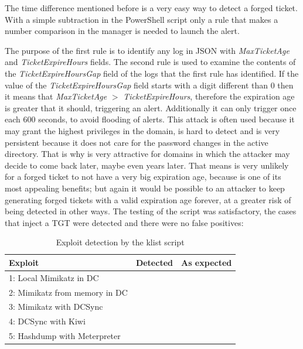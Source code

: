\linej
The time difference mentioned before is a very easy way to detect a forged ticket. With a simple subtraction in the PowerShell script only a rule that makes a number comparison in the manager is needed to launch the alert.
\linej

\linej
The purpose of the first rule is to identify any log in JSON with \textit{MaxTicketAge} and \textit{TicketExpireHours} fields. The second rule is used to examine the contents of the \textit{TicketExpireHoursGap} field of the logs that the first rule has identified. If the value of the \textit{TicketExpireHoursGap} field starts with a digit different than 0 then it means that \textit{MaxTicketAge} $>$ \textit{TicketExpireHours}, therefore the expiration age is greater that it should, triggering an alert.
Additionally it can only trigger once each 600 seconds, to avoid flooding of alerts.
\linej
\linej
This attack is often used because it may grant the highest privileges in the domain, is hard to detect and is very persistent because it does not care for the password changes in the active directory. That is why is very attractive for domains in which the attacker may decide to come back later, maybe even years later. That means is very unlikely for a forged ticket to not have a very big expiration age, because is one of its most appealing benefits; but again it would be possible to an attacker to keep generating forged tickets with a valid expiration age forever, at a greater risk of being detected in other ways.
\linej
\linej
The testing of the script was satisfactory, the cases that inject a TGT were detected and there were no false positives:
\begin{table}[H]
	\centering
	\begin{tabular}{|l|l|l|}
		\hline
		\rowcolor{gray!30}
		Exploit & Detected & As expected \\ \hline
		1: Local Mimikatz in DC& \RYES& \RYES\\ \hline
		2: Mimikatz from memory in DC& \RYES& \RYES\\ \hline
		3: Mimikatz with DCSync& \RYES& \RYES\\ \hline
		4: DCSync with Kiwi& \RNO& \RYES\\ \hline
		5: Hashdump with Meterpreter& \RNO& \RYES\\ \hline
	\end{tabular}
	\caption{Exploit detection by the klist script}
\end{table}
